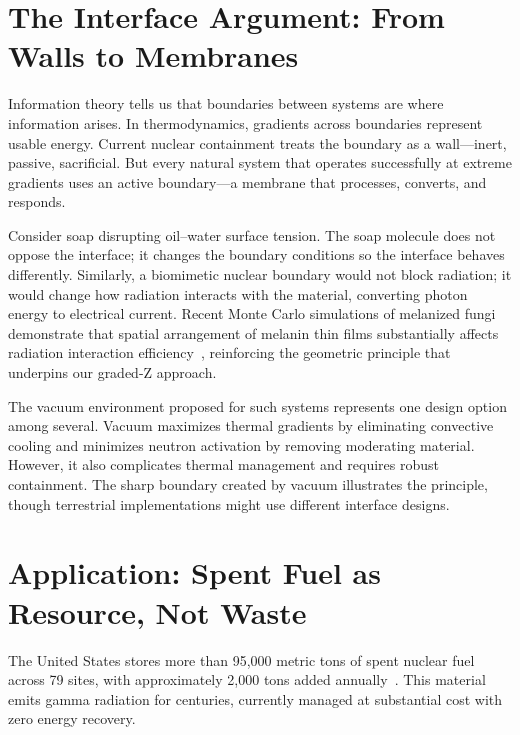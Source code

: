 \documentclass[12pt]{article}
\begin{document}
\section{The Interface Argument: From Walls to Membranes}

Information theory tells us that boundaries between systems are where information arises.
In thermodynamics, gradients across boundaries represent usable energy. Current nuclear
containment treats the boundary as a wall---inert, passive, sacrificial. But every
natural system that operates successfully at extreme gradients uses an active
boundary---a membrane that processes, converts, and responds.

Consider soap disrupting oil--water surface tension. The soap molecule does not oppose
the interface; it changes the boundary conditions so the interface behaves differently.
Similarly, a biomimetic nuclear boundary would not block radiation; it would change how
radiation interacts with the material, converting photon energy to electrical current.
Recent Monte Carlo simulations of melanized fungi demonstrate that spatial arrangement
of melanin thin films substantially affects radiation interaction efficiency~\cite{vasileiou2020},
reinforcing the geometric principle that underpins our graded-Z approach.

The vacuum environment proposed for such systems represents one design option among
several. Vacuum maximizes thermal gradients by eliminating convective cooling and
minimizes neutron activation by removing moderating material. However, it also
complicates thermal management and requires robust containment. The sharp boundary
created by vacuum illustrates the principle, though terrestrial implementations might
use different interface designs.

\section{Application: Spent Fuel as Resource, Not Waste}

The United States stores more than 95{,}000 metric tons of spent nuclear fuel across 79
sites, with approximately 2{,}000 tons added annually~\cite{doe2025}. This material emits
gamma radiation for centuries, currently managed at substantial cost with zero energy
recovery.
\end{document}
